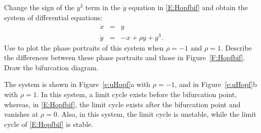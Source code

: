 \documentclass{ximera}
\begin{document}
\begin{exercise}  \label{e:uHopf}
Change the sign of the $y^3$ term in the $\dot{y}$ equation in 
\eqref{E:Hopfbif} and obtain the system of differential equations:
\[
\begin{array}{rcl}
\dot{x} & = & y \\
\dot{y} & = & -x + \rho y + y^3.  \end{array}
\]
Use {\pplane}
to plot the phase portraits of this system when 
$\rho=-1$ and $\rho=1$.  Describe the differences between these phase portraits
and those in Figure~\ref{F:Hopfbif}. Draw the bifurcation diagram.

\begin{solution}

The system is shown in Figure~\ref{e:uHopf}a with $\rho = -1$, and in
Figure~\ref{e:uHopf}b with $\rho = 1$.  In this system, a limit cycle
exists before the bifurcation point, whereas, in \eqref{E:Hopfbif}, the
limit cycle exists after the bifurcation point and vanishes at
$\rho = 0$.  Also, in this system, the limit cycle is unstable, while
the limit cycle of \eqref{E:Hopfbif} is stable.

\begin{figure}[htb]
                       \centerline{%
                       }
\end{figure}

\end{solution}
\end{exercise}
\end{document}
